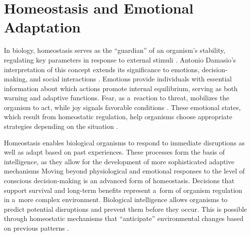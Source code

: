 \section*{Homeostasis and Emotional Adaptation}

In biology, homeostasis serves as the ``guardian'' of an organism's stability, regulating key parameters in response to external stimuli 
\parencites[][]{giordano_homeostasis_2013}[][]{davies_adaptive_2016}. %
 Antonio Damasio's interpretation of this concept extends its significance to emotions, decision-making, and social interactions 
\parencite[][]{damasio_homeostatic_2022}. %
 Emotions provide individuals with essential information about which actions promote internal equilibrium, serving as both warning and adaptive functions. Fear, as a~reaction to threat, mobilizes the organism to act, while joy signals favorable conditions 
\parencite[][]{piolopez_advances_2023}. %
 These emotional states, which result from homeostatic regulation, help organisms choose appropriate strategies depending on the situation 
\parencite[][]{goldstein_how_2019}.%
~



Homeostasis enables biological organisms to respond to immediate disruptions as well as adapt based on past experiences. These processes form the basis of intelligence, as they allow for the development of more sophisticated adaptive mechanisms 
\parencite[][]{torday_cell_2015} %
 Moving beyond physiological and emotional responses to the level of conscious decision-making is an advanced form of homeostasis. Decisions that support survival and long-term benefits represent a~form of organism regulation in a~more complex environment. Biological intelligence allows organisms to predict potential disruptions and prevent them before they occur. This is possible through homeostatic mechanisms that ``anticipate'' environmental changes based on previous patterns 
\parencite[][]{eskov_evolution_2017}.%
~



